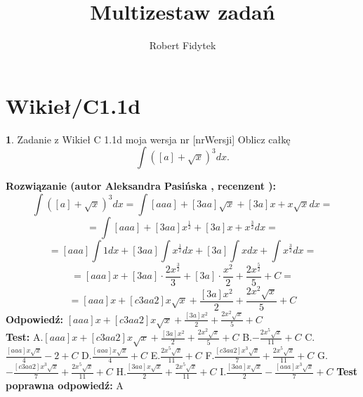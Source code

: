 \documentclass[12pt, a4paper]{article}
\title{Multizestaw zadań}
\author{Robert Fidytek}
\date{}
\theoremstyle{definition} %
\newtheorem{zad}{}
\newcommand{\kategoria}[1]{\section{#1}} %
\newcommand{\zadStart}[1]{\begin{zad}#1\newline} %
\newcommand{\zadStop}{\end{zad}}   %
\newcommand{\rozwStart}[2]{\noindent \textbf{Rozwiązanie (autor #1 , recenzent #2): }\newline} %
\newcommand{\rozwStop}{\newline}                                            %
\newcommand{\odpStart}{\noindent \textbf{Odpowiedź:}\newline}    %
\newcommand{\odpStop}{\newline}                                             %
\newcommand{\testStart}{\noindent \textbf{Test:}\newline} %
\newcommand{\testStop}{\newline} %
\newcommand{\kluczStart}{\noindent \textbf{Test poprawna odpowiedź:}\newline} %
\newcommand{\kluczStop}{\newline} %
\begin{document}
\maketitle


\kategoria{Wikieł/C1.1d}
\zadStart{Zadanie z Wikieł C 1.1d moja wersja nr [nrWersji]}
Oblicz całkę $$\int ([a]+\sqrt{x})^3dx.$$
\zadStop
\rozwStart{Aleksandra Pasińska}{}
$$\int ([a]+\sqrt{x})^3dx=\int [aaa]+[3aa]\sqrt{x}+[3a]x+x\sqrt{x}dx=$$
$$=\int [aaa]+[3aa]x^{\frac{1}{2}}+[3a]x+x^{\frac{3}{2}}dx=$$ 
$$=[aaa]\int 1dx+[3aa]\int x^\frac{1}{2}dx+[3a]\int xdx+\int x^{\frac{3}{2}}dx=$$
$$=[aaa]x+[3aa]\cdot \frac{2x^{\frac{3}{2}}}{3}+[3a]\cdot \frac{x^2}{2}+\frac{2x^{\frac{5}{2}}}{5}+C=$$
$$=[aaa]x+[c3aa2]x\sqrt{x}+\frac{[3a]x^2}{2}+\frac{2x^2\sqrt{x}}{5}+C$$
\rozwStop
\odpStart
$[aaa]x+[c3aa2]x\sqrt{x}+\frac{[3a]x^2}{2}+\frac{2x^2\sqrt{x}}{5}+C$\\
\odpStop
\testStart
A.$[aaa]x+[c3aa2]x\sqrt{x}+\frac{[3a]x^2}{2}+\frac{2x^2\sqrt{x}}{5}+C$
B.$-\frac{2x^5\sqrt{x}}{11}+C$
C.$\frac{[aaa]x\sqrt{x}}{4}-2+C$
D.$\frac{[aaa]x\sqrt{x}}{4}+C$
E.$\frac{2x^5\sqrt{x}}{11}+C$
F.$\frac{[c3aa2]x^3\sqrt{x}}{7}+\frac{2x^5\sqrt{x}}{11}+C$
G.$-\frac{[c3aa2]x^3\sqrt{x}}{7}+\frac{2x^5\sqrt{x}}{11}+C$
H.$\frac{[3aa]x\sqrt{x}}{2}+\frac{2x^5\sqrt{x}}{11}+C$
I.$\frac{[3aa]x\sqrt{x}}{2}-\frac{[aaa]x^3\sqrt{x}}{7}+C$
\testStop
\kluczStart
A
\kluczStop
\end{document}
